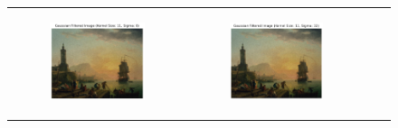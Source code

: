 \documentclass[hidelinks,12pt]{article}
\begin{document}
\begin{figure}[!h]
{\begin{tabular}{cccc}
\begin{subfigure}[h]{0.25\textwidth}
					\includegraphics[width=\textwidth]{figures/gaussian_filter/11.png}
				\end{subfigure} &
				\begin{subfigure}[h]{0.25\textwidth}
					\centering
					\includegraphics[width=\textwidth]{figures/gaussian_filter/12.png}
				\end{subfigure} \\
				

\end{tabular}}
\end{figure}
\end{document}
